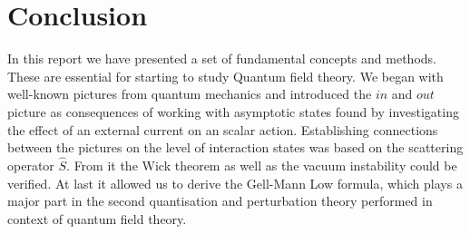 \documentclass[12pt, titlepage]{article}
\begin{document}
\section{Conclusion}
In this report we have presented a set of fundamental concepts and methods. These are essential for starting to study Quantum field theory. We began with well-known pictures from quantum mechanics and introduced the $ in $ and $ out $ picture as consequences of working with asymptotic states found by investigating the effect of an external current on an scalar action. Establishing connections between the pictures on the level of interaction states was based on the scattering operator $ \hat{S} $. From it the Wick theorem as well as the vacuum instability could be verified. At last it allowed us to derive the Gell-Mann Low formula, which plays a major part in the second quantisation and perturbation theory performed in context of quantum field theory. 
\newpage
\end{document}
